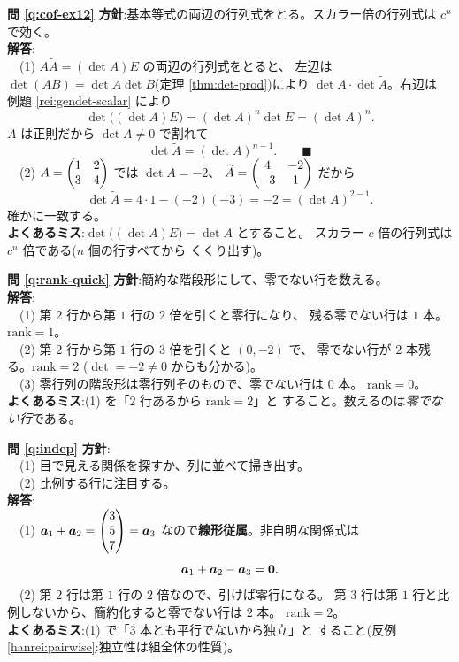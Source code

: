 \bigskip
\noindent\textbf{問 \ref{q:cof-ex12}}\quad
\textbf{方針}:基本等式の両辺の行列式をとる。スカラー倍の行列式は
$c^n$ で効く。\\
\textbf{解答}:\\
　(1) $A\widetilde{A} = (\det A)E$ の両辺の行列式をとると、
左辺は $\det(AB) = \det A \det B$(定理 \ref{thm:det-prod})により
$\det A \cdot \det \widetilde{A}$。右辺は
例題 \ref{rei:gendet-scalar} により
\[
\det\bigl((\det A)E\bigr) = (\det A)^n \det E = (\det A)^n.
\]
$A$ は正則だから $\det A \neq 0$ で割れて
\[
\det \widetilde{A} = (\det A)^{n-1}. \qquad \blacksquare
\]
　(2) $A = \begin{pmatrix}1 & 2 \\ 3 & 4\end{pmatrix}$ では $\det A = -2$、
$\widetilde{A} = \begin{pmatrix}4 & -2 \\ -3 & 1\end{pmatrix}$ だから
\[
\det \widetilde{A} = 4 \cdot 1 - (-2)(-3) = -2 = (\det A)^{2-1}.
\]
確かに一致する。\\
\textbf{よくあるミス}:$\det\bigl((\det A)E\bigr) = \det A$ とすること。
スカラー $c$ 倍の行列式は $c^n$ 倍である($n$ 個の行すべてから
くくり出す)。

\bigskip
\noindent\textbf{問 \ref{q:rank-quick}}\quad
\textbf{方針}:簡約な階段形にして、零でない行を数える。\\
\textbf{解答}:\\
　(1) 第 $2$ 行から第 $1$ 行の $2$ 倍を引くと零行になり、
残る零でない行は $1$ 本。$\mathrm{rank} = 1$。\\
　(2) 第 $2$ 行から第 $1$ 行の $3$ 倍を引くと $(0, -2)$ で、
零でない行が $2$ 本残る。$\mathrm{rank} = 2$
($\det = -2 \neq 0$ からも分かる)。\\
　(3) 零行列の階段形は零行列そのもので、零でない行は $0$ 本。
$\mathrm{rank} = 0$。\\
\textbf{よくあるミス}:(1) を「$2$ 行あるから $\mathrm{rank} = 2$」と
すること。数えるのは\emph{零でない行}である。

\bigskip
\noindent\textbf{問 \ref{q:indep}}\quad
\textbf{方針}:\\
　(1) 目で見える関係を探すか、列に並べて掃き出す。\\
　(2) 比例する行に注目する。\\
\textbf{解答}:\\
　(1) $\bm{a}_1 + \bm{a}_2 = \begin{pmatrix}3 \\ 5 \\ 7\end{pmatrix} = \bm{a}_3$
なので\textbf{線形従属}。非自明な関係式は
\[
\bm{a}_1 + \bm{a}_2 - \bm{a}_3 = \bm{0}.
\]
　(2) 第 $2$ 行は第 $1$ 行の $2$ 倍なので、引けば零行になる。
第 $3$ 行は第 $1$ 行と比例しないから、簡約化すると零でない行は $2$ 本。
$\mathrm{rank} = 2$。\\
\textbf{よくあるミス}:(1) で「$3$ 本とも平行でないから独立」と
すること(反例 \ref{hanrei:pairwise}:独立性は組全体の性質)。

